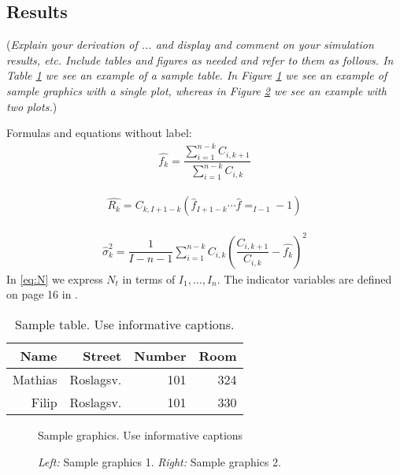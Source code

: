 \documentclass[a4paper]{article}
\begin{document}
\subsection*{Results}

({\it Explain your derivation of ... and display and comment on your simulation results, etc. Include tables and figures as needed and refer to them as follows. In Table \ref{tab:sampletab} we see an example of a sample table. In Figure \ref{fig:samplefig1} we see an example of sample graphics with a single plot, whereas in Figure \ref{fig:samplefig2} we see an example with two plots.}) 

Formulas and equations without label:
\begin{align*}
	\hat{f_k} = \dfrac{\sum_{i=1}^{n-k} C_{i,k+1}} {\sum_{i=1}^{n-k} C_{i,k}}
\end{align*}

\begin{align*}
	\hat{R_k} = C_{k,I+1-k} \left(  \hat{f}_{I+1-k} \cdots \hat{f}=_{I-1}-1\right)
\end{align*}

\begin{align}\label{eq:N}
	\hat{\sigma}_k^2 = \dfrac{1}{I-n-1} \sum_{i=1}^{n-k} C_{i,k}\left( \dfrac{ C_{i,k+1}}{ C_{i,k}} -\hat{f_k} \right)^2
\end{align}
In \eqref{eq:N} we express $N_t$ in terms of $I_1,\dots,I_n$. The indicator variables are defined on page 16 in \cite{Wuthrich-Merz-13}.

\begin{table}[!ht]
\center
\begin{tabular}{rrr|r}
Name & Street & Number & Room\\ 
\hline
Mathias & Roslagsv. & 101 & 324\\
Filip & Roslagsv. & 101 & 330\\
\hline
\end{tabular}
\caption{Sample table. Use informative captions.} \label{tab:sampletab}
\end{table}


 \begin{figure}[!ht]
 \center
  \caption{Sample graphics. Use informative captions}
  \label{fig:samplefig1}
\end{figure}


 \begin{figure}[!ht]
 \center
  \caption{\emph{Left:} Sample graphics 1. \emph{Right:} Sample graphics 2.}
  \label{fig:samplefig2}
\end{figure}
\end{document}
